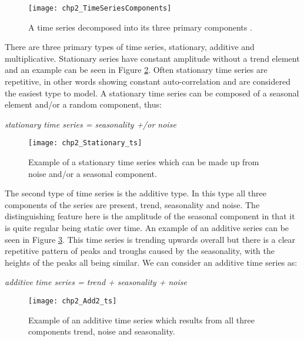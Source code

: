 \begin{figure}[tbph!]
\centering
\texttt{[image: chp2\_TimeSeriesComponents]}
\caption[Time series decomposed into primary components]{A time series decomposed into its three primary components \citep{CoghlanR}.}
\label{fig:TimeSeriesComponents}
\end{figure}

There are three primary types of time series, stationary, additive and multiplicative. Stationary series have constant amplitude without a trend element and an example can be seen in Figure \ref{fig:Stationary_ts}. Often stationary time series are repetitive, in other words showing constant auto-correlation and are considered the easiest type to model. A stationary time series can be composed of a seasonal element and/or a random component, thus:

\begin{center}
\textit{stationary time series = seasonality +/or noise}
\end{center}

\begin{figure}[tbph!]
\centering
\texttt{[image: chp2\_Stationary\_ts]}
\caption[Stationary time series]{Example of a stationary time series which can be made up from noise and/or a seasonal component.}
\label{fig:Stationary_ts}
\end{figure}

The second type of time series is the additive type. In this type all three components of the series are present, trend, seasonality and noise. The distinguishing feature here is the amplitude of the seasonal component in that it is quite regular being static over time. An example of an additive series can be seen in Figure \ref{fig:Add2_ts}. This time series is trending upwards overall but there is a clear repetitive pattern of peaks and troughs caused by the seasonality, with the heights of the peaks all being similar. We can consider an additive time series as:

\begin{center}
\textit{additive time series = trend + seasonality + noise}
\end{center}

\begin{figure}[tbph!]
\centering
\texttt{[image: chp2\_Add2\_ts]}
\caption[Additive time series]{Example of an additive time series which results from all three components trend, noise and seasonality.}
\label{fig:Add2_ts}
\end{figure}

